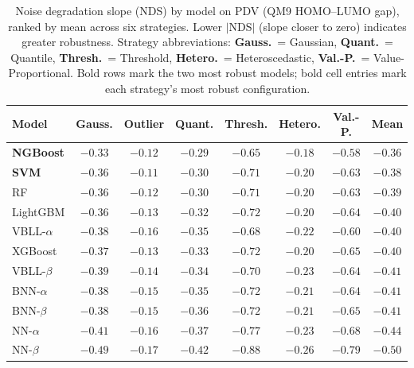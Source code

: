 \begin{table}[htbp]
\centering
\caption{Noise degradation slope (NDS) by model on PDV (QM9 HOMO--LUMO gap), ranked by mean across six strategies. Lower $|$NDS$|$ (slope closer to zero) indicates greater robustness. Strategy abbreviations: \textbf{Gauss.}\ = Gaussian, \textbf{Quant.}\ = Quantile, \textbf{Thresh.}\ = Threshold, \textbf{Hetero.}\ = Heteroscedastic, \textbf{Val.-P.}\ = Value-Proportional. Bold rows mark the two most robust models; bold cell entries mark each strategy's most robust configuration.}
\label{tab:nds_ranking}
\small
\begin{tabular}{lccccccc}
\toprule
\textbf{Model} & \textbf{Gauss.} & \textbf{Outlier} & \textbf{Quant.} & \textbf{Thresh.} & \textbf{Hetero.} & \textbf{Val.-P.} & \textbf{Mean} \\
\midrule
\textbf{NGBoost}    & $\mathbf{-0.33}$ & $-0.12$ & $\mathbf{-0.29}$ & $\mathbf{-0.65}$ & $\mathbf{-0.18}$ & $\mathbf{-0.58}$ & $\mathbf{-0.36}$ \\
\textbf{SVM}        & $-0.36$ & $\mathbf{-0.11}$ & $-0.30$ & $-0.71$ & $-0.20$ & $-0.63$ & $-0.38$ \\
RF                  & $-0.36$ & $-0.12$ & $-0.30$ & $-0.71$ & $-0.20$ & $-0.63$ & $-0.39$ \\
LightGBM            & $-0.36$ & $-0.13$ & $-0.32$ & $-0.72$ & $-0.20$ & $-0.64$ & $-0.40$ \\
VBLL-$\alpha$       & $-0.38$ & $-0.16$ & $-0.35$ & $-0.68$ & $-0.22$ & $-0.60$ & $-0.40$ \\
XGBoost             & $-0.37$ & $-0.13$ & $-0.33$ & $-0.72$ & $-0.20$ & $-0.65$ & $-0.40$ \\
VBLL-$\beta$        & $-0.39$ & $-0.14$ & $-0.34$ & $-0.70$ & $-0.23$ & $-0.64$ & $-0.41$ \\
BNN-$\alpha$        & $-0.38$ & $-0.15$ & $-0.35$ & $-0.72$ & $-0.21$ & $-0.64$ & $-0.41$ \\
BNN-$\beta$         & $-0.38$ & $-0.15$ & $-0.36$ & $-0.72$ & $-0.21$ & $-0.65$ & $-0.41$ \\
NN-$\alpha$         & $-0.41$ & $-0.16$ & $-0.37$ & $-0.77$ & $-0.23$ & $-0.68$ & $-0.44$ \\
NN-$\beta$          & $-0.49$ & $-0.17$ & $-0.42$ & $-0.88$ & $-0.26$ & $-0.79$ & $-0.50$ \\
\bottomrule
\end{tabular}
\end{table}

